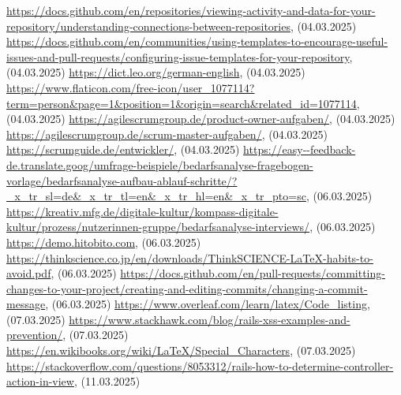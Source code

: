 \renewcommand\bibname{Quellenverzeichnis}
\begin{thebibliography}{9}
     \url{https://docs.github.com/en/repositories/viewing-activity-and-data-for-your-repository/understanding-connections-between-repositories}, (04.03.2025)
     \url{https://docs.github.com/en/communities/using-templates-to-encourage-useful-issues-and-pull-requests/configuring-issue-templates-for-your-repository}, (04.03.2025)
     \url{https://dict.leo.org/german-english}, (04.03.2025)
     \url{https://www.flaticon.com/free-icon/user_1077114?term=person&page=1&position=1&origin=search&related_id=1077114}, (04.03.2025)
     \url{https://agilescrumgroup.de/product-owner-aufgaben/}, (04.03.2025)
     \url{https://agilescrumgroup.de/scrum-master-aufgaben/}, (04.03.2025)
     \url{https://scrumguide.de/entwickler/}, (04.03.2025)
     \url{https://easy--feedback-de.translate.goog/umfrage-beispiele/bedarfsanalyse-fragebogen-vorlage/bedarfsanalyse-aufbau-ablauf-schritte/?_x_tr_sl=de&_x_tr_tl=en&_x_tr_hl=en&_x_tr_pto=sc}, (06.03.2025)
     \url{https://kreativ.mfg.de/digitale-kultur/kompass-digitale-kultur/prozess/nutzerinnen-gruppe/bedarfsanalyse-interviews/}, (06.03.2025)
     \url{https://demo.hitobito.com}, (06.03.2025)
     \url{https://thinkscience.co.jp/en/downloads/ThinkSCIENCE-LaTeX-habits-to-avoid.pdf}, (06.03.2025)
     \url{https://docs.github.com/en/pull-requests/committing-changes-to-your-project/creating-and-editing-commits/changing-a-commit-message}, (06.03.2025)
     \url{https://www.overleaf.com/learn/latex/Code_listing}, (07.03.2025)
     \url{https://www.stackhawk.com/blog/rails-xss-examples-and-prevention/}, (07.03.2025)
     \url{https://en.wikibooks.org/wiki/LaTeX/Special_Characters}, (07.03.2025)
     \url{https://stackoverflow.com/questions/8053312/rails-how-to-determine-controller-action-in-view}, (11.03.2025)

\end{thebibliography}
